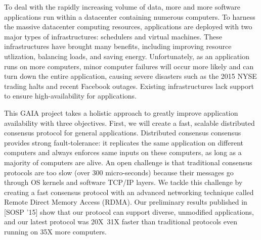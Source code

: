 
{}

To deal with the rapidly increasing volume of data, more and more software
applications run within a datacenter containing numerous computers. To 
harness the massive datacenter computing resources, applications are deployed 
with two major types of infrastructures: schedulers and virtual machines. 
These infrastructures have brought many benefits, including improving resource 
utlization, balancing loads, and saving energy. Unfortunately, as an application 
runs on more computers, minor computer failures will occur more likely and can 
turn down the entire application, causing severe disasters such as the 2015 
NYSE trading halts and recent Facebook outages. Existing infrastructures lack 
support to ensure high-availability for applications.

This GAIA project takes a holistic approach to greatly improve application 
availability with three objectives. First, we will create a fast, scalable 
distributed consensus protocol for general applications. Distributed consensus 
consensus provides strong fault-tolerance: it replicates the same application 
on different computers and always enforces same inputs on these computers, as 
long as a majority of computers are alive. An open challenge is that 
traditional consensus protocols are too slow (over 300 micro-seconds) because 
their messages go through OS kernels and software TCP/IP layers. We tackle this 
challenge by creating a fast consensus protocol with an advanced networking 
technique called Remote Direct Memory Access (RDMA). Our preliminary results 
published in [SOSP '15] show that our protocol can support diverse, 
unmodified applications, and our latest protocol was 20X~31X faster than 
traditional protocols even running on 35X more computers.


